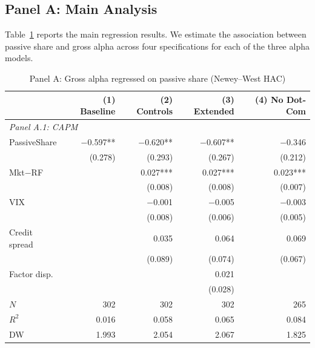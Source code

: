 \documentclass[11pt, a4paper]{article}
\begin{document}
\subsection{Panel A: Main Analysis}
\label{subsec:panel_a}

Table~\ref{tab:panel_a} reports the main regression results. We estimate the association between passive share and gross alpha across four specifications for each of the three alpha models.

\begin{table}[H]
\centering
\caption{Panel A: Gross alpha regressed on passive share (Newey--West HAC)}
\label{tab:panel_a}
\small
\begin{tabular}{lrrrr}
\toprule
 & \textbf{(1) Baseline} & \textbf{(2) Controls} & \textbf{(3) Extended} & \textbf{(4) No Dot-Com} \\
\midrule
\multicolumn{5}{l}{\textit{Panel A.1: CAPM}} \\
PassiveShare    & $-$0.597**\phantom{*}  & $-$0.620**\phantom{*}  & $-$0.607**\phantom{*}  & $-$0.346\phantom{***} \\
                & (0.278)               & (0.293)               & (0.267)               & (0.212) \\
Mkt$-$RF       &                       & 0.027***              & 0.027***              & 0.023*** \\
                &                       & (0.008)               & (0.008)               & (0.007) \\
VIX             &                       & $-$0.001\phantom{***} & $-$0.005\phantom{***} & $-$0.003\phantom{***} \\
                &                       & (0.008)               & (0.006)               & (0.005) \\
Credit spread   &                       & 0.035\phantom{***}    & 0.064\phantom{***}    & 0.069\phantom{***} \\
                &                       & (0.089)               & (0.074)               & (0.067) \\
Factor disp.    &                       &                       & 0.021\phantom{***}    &  \\
                &                       &                       & (0.028)               &  \\[6pt]
$N$             & 302  & 302  & 302  & 265  \\
$R^2$           & 0.016 & 0.058 & 0.065 & 0.084 \\
DW              & 1.993 & 2.054 & 2.067 & 1.825 \\

\end{tabular}
\end{table}
\end{document}
